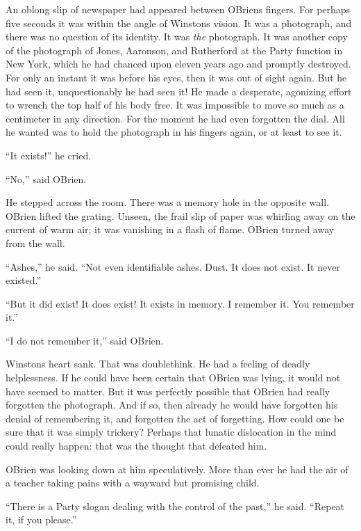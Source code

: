 An oblong slip of newspaper had appeared between
O\textquotesingle Brien\textquotesingle s fingers. For perhaps five
seconds it was within the angle of Winston\textquotesingle s vision. It
was a photograph, and there was no question of its identity. It was
\emph{the} photograph. It was another copy of the photograph of Jones,
Aaronson, and Rutherford at the Party function in New York, which he had
chanced upon eleven years ago and promptly destroyed. For only an
instant it was before his eyes, then it was out of sight again. But he
had seen it, unquestionably he had seen it! He made a desperate,
agonizing effort to wrench the top half of his body free. It was
impossible to move so much as a centimeter in any direction. For the
moment he had even forgotten the dial. All he wanted was to hold the
photograph in his fingers again, or at least to see it.

``It exists!'' he cried.

``No,'' said O\textquotesingle Brien.

He stepped across the room. There was a memory hole in the opposite
wall. O\textquotesingle Brien lifted the grating. Unseen, the frail slip
of paper was whirling away on the current of warm air; it was vanishing
in a flash of flame. O\textquotesingle Brien turned away from the wall.

``Ashes,'' he said. ``Not even identifiable ashes. Dust. It does not exist.
It never existed.''

``But it did exist! It does exist! It exists in memory. I remember it.
You remember it.''

``I do not remember it,'' said O\textquotesingle Brien.

Winston\textquotesingle s heart sank. That was doublethink. He had a
feeling of deadly helplessness. If he could have been certain that
O\textquotesingle Brien was lying, it would not have seemed to matter.
But it was perfectly possible that O\textquotesingle Brien had really
forgotten the photograph. And if so, then already he would have
forgotten his denial of remembering it, and forgotten the act of
forgetting. How could one be sure that it was simply trickery? Perhaps
that lunatic dislocation in the mind could really happen: that was the
thought that defeated him.

O\textquotesingle Brien was looking down at him speculatively. More than
ever he had the air of a teacher taking pains with a wayward but
promising child.

``There is a Party slogan dealing with the control of the past,'' he said.
``Repeat it, if you please.''

